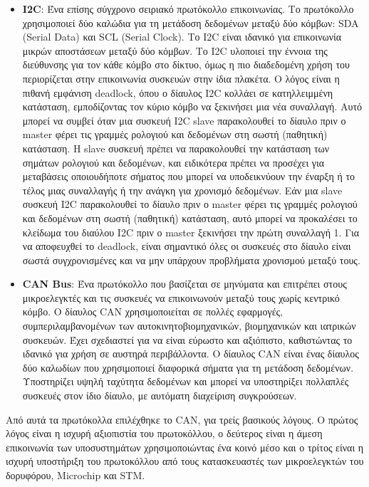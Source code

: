 \documentclass[a4paper,nobib,justified]{tufte-book}
\begin{document}
\begin{itemize}
	\item \textbf{I2C}: Ένα επίσης σύγχρονο σειριακό πρωτόκολλο επικοινωνίας. Το πρωτόκολλο χρησιμοποιεί δύο καλώδια για τη μετάδοση δεδομένων μεταξύ δύο κόμβων: SDA (Serial Data) και SCL (Serial Clock). Το I2C είναι ιδανικό για επικοινωνία μικρών αποστάσεων μεταξύ δύο κόμβων. Το I2C υλοποιεί την έννοια της διεύθυνσης για τον κάθε κόμβο στο δίκτυο, όμως η πιο διαδεδομένη χρήση του περιορίζεται στην επικοινωνία συσκευών στην ίδια πλακέτα. Ο λόγος είναι η πιθανή εμφάνιση deadlock, όπου ο δίαυλος I2C κολλάει σε κατηλλειμμένη κατάσταση, εμποδίζοντας τον κύριο κόμβο να ξεκινήσει μια νέα συναλλαγή. Αυτό μπορεί να συμβεί όταν μια συσκευή I2C slave παρακολουθεί το δίαυλο πριν ο master φέρει τις γραμμές ρολογιού και δεδομένων στη σωστή (παθητική) κατάσταση. Η slave συσκευή πρέπει να παρακολουθεί την κατάσταση των σημάτων ρολογιού και δεδομένων, και ειδικότερα πρέπει να προσέχει για μεταβάσεις οποιουδήποτε σήματος που μπορεί να υποδεικνύουν την έναρξη ή το τέλος μιας συναλλαγής ή την ανάγκη για χρονισμό δεδομένων. Εάν μια slave συσκευή I2C παρακολουθεί το δίαυλο πριν ο master φέρει τις γραμμές ρολογιού και δεδομένων στη σωστή (παθητική) κατάσταση, αυτό μπορεί να προκαλέσει το κλείδωμα του διαύλου I2C πριν ο master ξεκινήσει την πρώτη συναλλαγή 1. Για να αποφευχθεί το deadlock, είναι σημαντικό όλες οι συσκευές στο δίαυλο είναι σωστά συγχρονισμένες και να μην υπάρχουν προβλήματα χρονισμού μεταξύ τους.
	\item \textbf{CAN Bus}: Ένα πρωτόκολλο που βασίζεται σε μηνύματα και επιτρέπει στους μικροελεγκτές και τις συσκευές να επικοινωνούν μεταξύ τους χωρίς κεντρικό κόμβο. Ο δίαυλος CAN χρησιμοποιείται σε πολλές εφαρμογές, συμπεριλαμβανομένων των αυτοκινητοβιομηχανικών, βιομηχανικών και ιατρικών συσκευών. Έχει σχεδιαστεί για να είναι εύρωστο και αξιόπιστο, καθιστώντας το ιδανικό για χρήση σε αυστηρά περιβάλλοντα. Ο δίαυλος CAN είναι ένας δίαυλος δύο καλωδίων που χρησιμοποιεί διαφορικά σήματα για τη μετάδοση δεδομένων. Υποστηρίζει υψηλή ταχύτητα δεδομένων και μπορεί να υποστηρίξει πολλαπλές συσκευές στον ίδιο δίαυλο, με αυτόματη διαχείριση συγκρούσεων. 
\end{itemize}

Από αυτά τα πρωτόκολλα επιλέχθηκε το \acs{CAN}, για τρείς βασικούς λόγους. Ο πρώτος λόγος είναι η ισχυρή αξιοπιστία του πρωτοκόλλου, ο δεύτερος είναι η άμεση επικοινωνία των υποσυστημάτων χρησιμοποιώντας ένα κοινό μέσο και ο τρίτος είναι η ισχυρή υποστήριξη του πρωτοκόλλου από τους κατασκευαστές των μικροελεγκτών του δορυφόρου, Microchip και STM.
\end{document}
